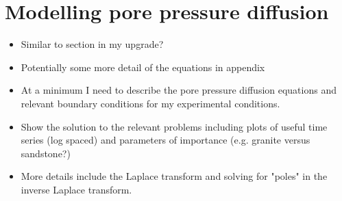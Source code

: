 \section{Modelling pore pressure diffusion}
\begin{itemize}
    \item Similar to section in my upgrade?
    \item Potentially some more detail of the equations in appendix
    \item At a minimum I need to describe the pore pressure diffusion equations and relevant boundary conditions for my experimental conditions.
    \item Show the solution to the relevant problems including plots of useful time series (log spaced) and parameters of importance (e.g. granite versus sandstone?)
    \item More details include the Laplace transform and solving for "poles" in the inverse Laplace transform.
\end{itemize}


